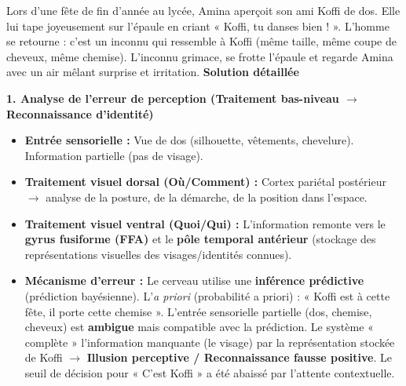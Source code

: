 \documentclass[11pt]{article}
\begin{document}
\begin{exoresolu}
Lors d'une fête de fin d'année au lycée, Amina aperçoit son ami Koffi de dos. Elle lui tape joyeusement sur l'épaule en criant « Koffi, tu danses bien ! ». L'homme se retourne : c'est un inconnu qui ressemble à Koffi (même taille, même coupe de cheveux, même chemise). L'inconnu grimace, se frotte l'épaule et regarde Amina avec un air mêlant surprise et irritation.
\tcblower
\textbf{Solution détaillée}

\textbf{1. Analyse de l'erreur de perception (Traitement bas-niveau $\to$ Reconnaissance d'identité)}
\begin{itemize}
    \item \textbf{Entrée sensorielle :} Vue de dos (silhouette, vêtements, chevelure). Information partielle (pas de visage).
    \item \textbf{Traitement visuel dorsal (Où/Comment) :} Cortex pariétal postérieur $\to$ analyse de la posture, de la démarche, de la position dans l'espace.
    \item \textbf{Traitement visuel ventral (Quoi/Qui) :} L'information remonte vers le \textbf{gyrus fusiforme (FFA)} et le \textbf{pôle temporal antérieur} (stockage des représentations visuelles des visages/identités connues).
    \item \textbf{Mécanisme d'erreur :} Le cerveau utilise une \textbf{inférence prédictive} (prédiction bayésienne). L'\emph{a priori} (probabilité a priori) : « Koffi est à cette fête, il porte cette chemise ». L'entrée sensorielle partielle (dos, chemise, cheveux) est \textbf{ambigue} mais compatible avec la prédiction. Le système « complète » l'information manquante (le visage) par la représentation stockée de Koffi $\to$ \textbf{Illusion perceptive / Reconnaissance fausse positive}. Le seuil de décision pour « C'est Koffi » a été abaissé par l'attente contextuelle.
\end{itemize}


\end{exoresolu}
\end{document}
